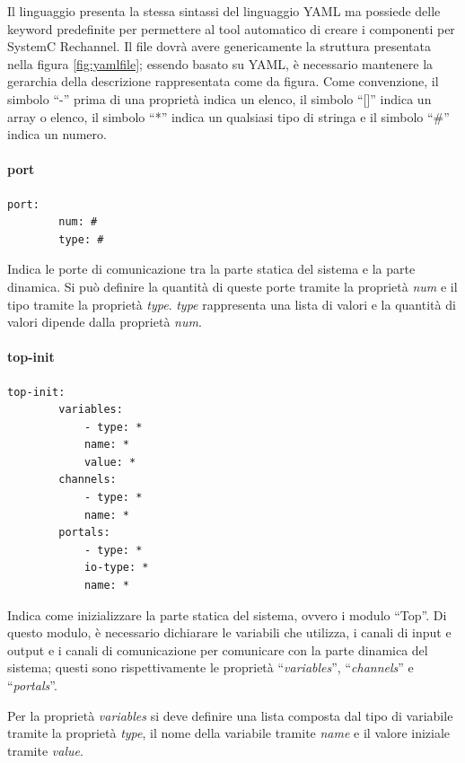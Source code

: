 \documentclass[a4paper,titlepage]{book}
\begin{document}
Il linguaggio presenta la stessa sintassi del linguaggio YAML ma possiede delle keyword predefinite per permettere al tool automatico di creare i componenti per SystemC Rechannel. Il file dovrà avere genericamente la struttura presentata nella figura \ref{fig:yamlfile}; essendo basato su YAML, è necessario mantenere la gerarchia della descrizione rappresentata come da figura. Come convenzione, il simbolo ``-'' prima di una proprietà indica un elenco, il simbolo ``[]'' indica un array o elenco, il simbolo ``*'' indica un qualsiasi tipo di stringa e il simbolo ``\#'' indica un numero.


\paragraph{port}

\begin{lstlisting}[frame=single]
	port:
		num: #
		type: #
\end{lstlisting}

Indica le porte di comunicazione tra la parte statica del sistema e la parte dinamica. Si può definire la quantità di queste porte tramite la proprietà \textit{num} e il tipo tramite la proprietà \textit{type}. \textit{type} rappresenta una lista di valori e la quantità di valori dipende dalla proprietà \textit{num}.
 
\paragraph{top-init} 

\begin{lstlisting}[frame=single]
	top-init:
		variables:
			- type: *
			name: *
			value: *
		channels:
			- type: *
			name: *
		portals:
			- type: *
			io-type: *
			name: *
\end{lstlisting}

Indica come inizializzare la parte statica del sistema, ovvero i modulo ``Top''. Di questo modulo, è necessario dichiarare le variabili che utilizza, i canali di input e output e i canali di comunicazione per comunicare con la parte dinamica del sistema; questi sono rispettivamente le proprietà ``\textit{variables}'', ``\textit{channels}'' e ``\textit{portals}''.

Per la proprietà \textit{variables} si deve definire una lista composta dal tipo di variabile tramite la proprietà \textit{type}, il nome della variabile tramite \textit{name} e il valore iniziale tramite \textit{value}.
\end{document}
